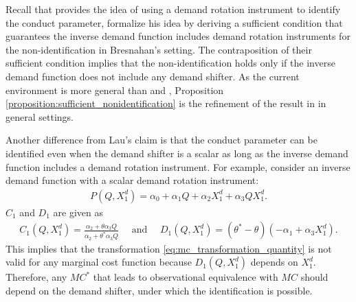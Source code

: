 \documentclass[11pt, a4paper]{article}
\begin{document}
Recall that \citet{bresnahanOligopoly1982} provides the idea of using a demand rotation instrument to identify the conduct parameter, \citet{matsumuraResolving2023} formalize his idea by deriving a sufficient condition that guarantees the inverse demand function includes demand rotation instruments for the non-identification in Bresnahan's setting.
The contraposition of their sufficient condition implies that the non-identification holds only if the inverse demand function does not include any demand shifter.
As the current environment is more general than \citet{bresnahanOligopoly1982} and \citet{matsumuraResolving2023}, Proposition \ref{proposition:sufficient_nonidentification} is the refinement of the result in \citet{matsumuraResolving2023} in general settings.

Another difference from Lau's claim is that the conduct parameter can be identified even when the demand shifter is a scalar as long as the inverse demand function includes a demand rotation instrument.
For example, consider an inverse demand function with a scalar demand rotation instrument:
\begin{align}
    P(Q, X^{d}_1) = \alpha_0 + \alpha_1 Q + \alpha_2X^{d}_1 + \alpha_3QX^{d}_1.
\end{align}
$C_1$ and $D_1$ are given as
\begin{align}
    C_1(Q, X^{d}_1) = \frac{\alpha_2 + \theta\alpha_3Q}{\alpha_2 + \theta^{*}\alpha_3Q}\quad \text{ and }\quad  D_1(Q, X^{d}_1) =  (\theta^{*} - \theta)(-\alpha_1 + \alpha_3X^{d}_1).
\end{align}
This implies that the transformation \eqref{eq:mc_transformation_quantity} is not valid for any marginal cost function because $D_1(Q, X^{d}_1)$ depends on $X^{d}_1$.
Therefore, any $MC^{*}$ that leads to observational equivalence with $MC$ should depend on the demand shifter, under which the identification is possible.
\end{document}
